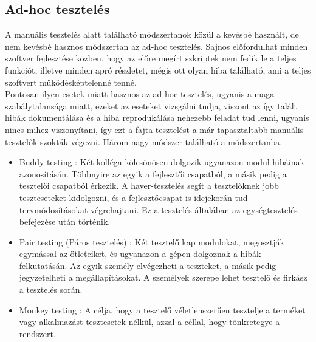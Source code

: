 \subsection{Ad-hoc tesztelés} A manuális tesztelés alatt található módszertanok közül a kevésbé használt, de nem kevésbé hasznos módszertan az ad-hoc tesztelés. Sajnos előfordulhat minden szoftver fejlesztése közben, hogy az előre megírt szkriptek nem fedik le a teljes funkciót, illetve minden apró részletet, mégis ott olyan hiba található, ami a teljes szoftvert működésképtelenné tenné.\\ Pontosan ilyen esetek miatt hasznos az ad-hoc tesztelés, ugyanis a maga szabálytalansága miatt, ezeket az eseteket vizsgálni tudja, viszont az így talált hibák dokumentálása és a hiba reprodukálása nehezebb feladat tud lenni, ugyanis nincs mihez viszonyítani, így ezt a fajta tesztelést a már tapasztaltabb manuális tesztelők szokták végezni. Három nagy módszer található a módszertanba.
\begin{itemize}
\item Buddy testing : Két kolléga kölcsönösen dolgozik ugyanazon modul hibáinak azonosításán. Többnyire az egyik a fejlesztői csapatból, a másik pedig a tesztelői csapatból érkezik. A haver-tesztelés segít a tesztelőknek jobb teszteseteket kidolgozni, és a fejlesztőcsapat is idejekorán tud tervmódosításokat végrehajtani. Ez a tesztelés általában az egységtesztelés befejezése után történik\cite{guru99}.
\item Pair testing (Páros tesztelés) : Két tesztelő kap modulokat, megosztják egymással az ötleteiket, és ugyanazon a gépen dolgoznak a hibák felkutatásán. Az egyik személy elvégezheti a teszteket, a másik pedig jegyzetelheti a megállapításokat. A személyek szerepe lehet tesztelő és firkász a tesztelés során\cite{guru99}.
\item Monkey testing : A célja, hogy a tesztelő véletlenszerűen tesztelje a terméket vagy alkalmazást tesztesetek nélkül, azzal a céllal, hogy tönkretegye a rendszert\cite{guru99}.
\end{itemize} 

